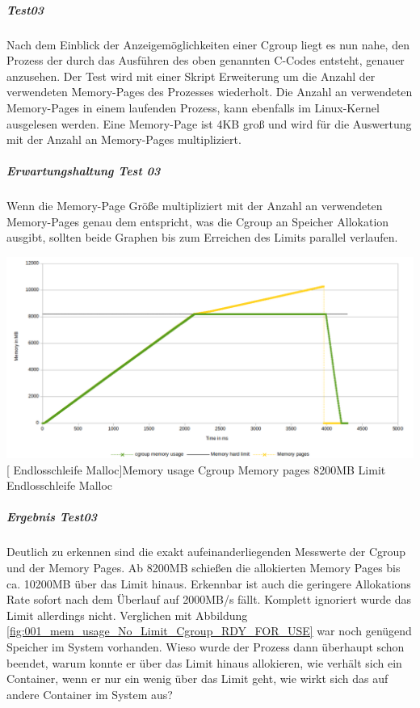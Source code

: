\subparagraph{Test03}
Nach dem Einblick der Anzeigemöglichkeiten einer Cgroup liegt es nun nahe, den Prozess der durch das Ausführen des oben genannten C-Codes entsteht, genauer anzusehen. Der Test wird mit einer Skript Erweiterung um die Anzahl der verwendeten Memory-Pages des Prozesses wiederholt. Die Anzahl an verwendeten Memory-Pages in einem laufenden Prozess, kann ebenfalls im Linux-Kernel ausgelesen werden. Eine Memory-Page ist 4KB groß und wird für die Auswertung mit der Anzahl an Memory-Pages multipliziert.

\subparagraph{Erwartungshaltung Test 03}
Wenn die Memory-Page Größe multipliziert mit der Anzahl an verwendeten Memory-Pages genau dem entspricht, was die Cgroup an Speicher Allokation ausgibt, sollten beide Graphen bis zum Erreichen des Limits parallel verlaufen.

\vspace{1em}
\begin{minipage}{\linewidth}
	\centering
	\includegraphics[width=1\linewidth]{pics/003_mem_usage_8200mb_limit_Cgroup_Pages_RDY_FOR_USE.png}
	[ Endlosschleife Malloc]{Memory usage Cgroup Memory pages 8200MB Limit Endlosschleife Malloc}
	\label{fig:003_mem_usage_8200mb_limit_Cgroup_Pages_RDY_FOR_USE}
\end{minipage}

\subparagraph{Ergebnis Test03}
Deutlich zu erkennen sind die exakt aufeinanderliegenden Messwerte der Cgroup und der Memory Pages. Ab 8200MB schießen die allokierten Memory Pages bis ca. 10200MB über das Limit hinaus. Erkennbar ist auch die geringere Allokations Rate sofort nach dem Überlauf auf 2000MB/s fällt. Komplett ignoriert wurde das Limit allerdings nicht. Verglichen mit Abbildung \ref{fig:001_mem_usage_No_Limit_Cgroup_RDY_FOR_USE} war noch genügend Speicher im System vorhanden. Wieso wurde der Prozess dann überhaupt schon beendet, warum konnte er über das Limit hinaus allokieren, wie verhält sich ein Container, wenn er nur ein wenig über das Limit geht, wie wirkt sich das auf andere Container im System aus?

